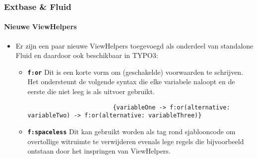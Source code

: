 \begin{frame}[fragile]
	\frametitle{Extbase \& Fluid}
	\framesubtitle{Nieuwe ViewHelpers}

	\lstset{basicstyle=\tiny\ttfamily}

	\begin{itemize}
		\item Er zijn een paar nieuwe ViewHelpers toegevoegd als onderdeel van standalone Fluid
			en daardoor ook beschikbaar in TYPO3:

			\begin{itemize}

				\item \textbf{\texttt{f:or}}\newline
					Dit is een korte vorm om (geschakelde) voorwaarden te schrijven.
					Het ondersteunt de volgende syntax die elke variabele naloopt en
					de eerste die niet leeg is als uitvoer gebruikt.

					\begin{lstlisting}
						{variableOne -> f:or(alternative: variableTwo) -> f:or(alternative: variableThree)}
					\end{lstlisting}

				\item \textbf{\texttt{f:spaceless}}\newline
					Dit kan gebruikt worden als tag rond sjablooncode om
					overtollige witruimte te verwijderen evenals lege regels
					die bijvoorbeeld ontstaan door het inspringen van ViewHelpers.

			\end{itemize}

	\end{itemize}

\end{frame}

